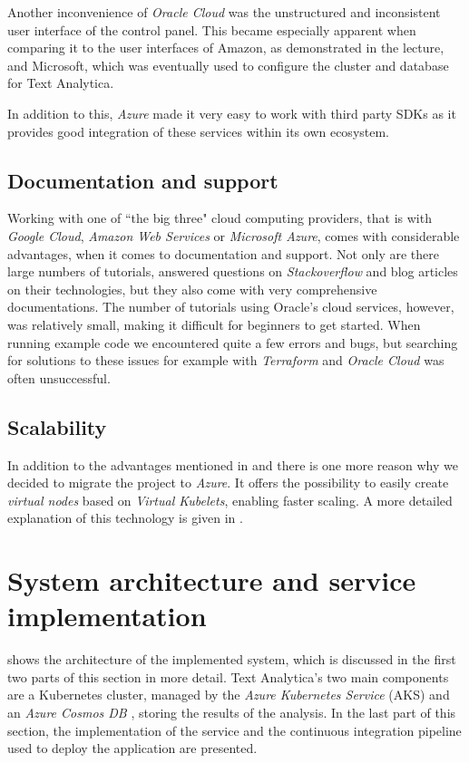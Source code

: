 \documentclass[conference]{IEEEtran}
\begin{document}
Another inconvenience of \textit{Oracle Cloud} was the unstructured and inconsistent user interface of the control panel. This became especially apparent when comparing it to the user interfaces of Amazon, as demonstrated in the lecture, and Microsoft, which was eventually used to configure the cluster and database for Text Analytica.

In addition to this, \textit{Azure} made it very easy to work with third party SDKs as it provides good integration of these services within its own ecosystem.

\subsection{Documentation and support}
\label{subsec:docandsupport}
Working with one of ``the big three" cloud computing providers, that is with \textit{Google Cloud}, \textit{Amazon Web Services} or \textit{Microsoft Azure}, comes with considerable advantages, when it comes to documentation and support. Not only are there large numbers of tutorials, answered questions on \textit{Stackoverflow} and blog articles on their technologies, but they also come with very comprehensive documentations. The number of tutorials using Oracle's cloud services, however, was relatively small, making it difficult for beginners to get started. When running example code we encountered quite a few errors and bugs, but searching for solutions to these issues for example with \textit{Terraform} and \textit{Oracle Cloud} was often unsuccessful.

\subsection{Scalability}
In addition to the advantages mentioned in  and  there is one more reason why we decided to migrate the project to \textit{Azure}. It offers the possibility to easily create \textit{virtual nodes} based on \textit{Virtual Kubelets}\cite{VirtualKubelet}, enabling faster scaling. A more detailed explanation of this technology is given in .

\section{System architecture and service implementation}
\label{sec:system-architecture}
 shows the architecture of the implemented system, which is discussed in the first two parts of this section in more detail. Text Analytica's two main components are a Kubernetes cluster, managed by the \textit{Azure Kubernetes Service} (AKS) \cite{AKS} and an \textit{Azure Cosmos DB} \cite{CosmosDB}, storing the results of the analysis. In the last part of this section, the implementation of the service and the continuous integration pipeline used to deploy the application are presented.
\end{document}
